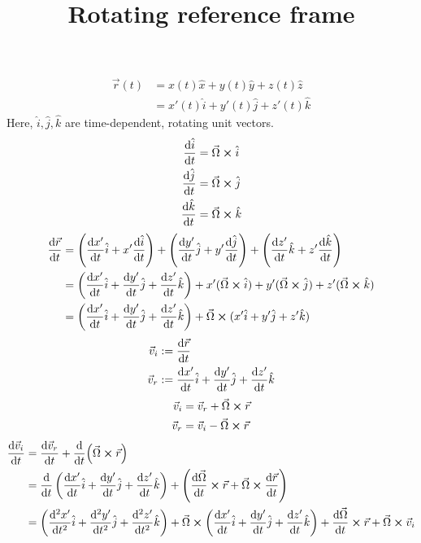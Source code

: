 \documentclass{article}
\title{Rotating reference frame}
\author{}
\date{}
\begin{document}
\maketitle

\begin{align*}
	\vec{r} (t) &= x (t) \hat{x} + y (t) \hat{y} + z (t) \hat{z} \\
	& = x' (t) \hat{i} + y' (t) \hat{j} + z' (t) \hat{k}
\end{align*}
Here, $\hat{i},\hat{j},\hat{k}$ are time-dependent, rotating unit vectors.
\begin{align*}
	\dv{\hat{i}}{t} &= \vec{\Omega} \cross \hat{i} \\
	\dv{\hat{j}}{t} &= \vec{\Omega} \cross \hat{j} \\
	\dv{\hat{k}}{t} &= \vec{\Omega} \cross \hat{k}
\end{align*}
\begin{align*}
	\dv{\vec{r}}{t} &= \left( \dv{x'}{t} \hat{i} + x'  \dv{\hat{i}}{t}  \right) + \left( \dv{y'}{t} \hat{j} + y' \dv{\hat{j}}{t} \right) + \left( \dv{z'}{t} \hat{k} + z' \dv{\hat{k}}{t} \right) \\
	&= \left( \dv{x'}{t} \hat{i} + \dv{y'}{t} \hat{j} + \dv{z'}{t} \hat{k} \right) + x' (\vec{\Omega} \cross \hat{i}) + y' (\vec{\Omega} \cross \hat{j}) + z' (\vec{\Omega} \cross \hat{k}) \\
	&= \left( \dv{x'}{t} \hat{i} + \dv{y'}{t} \hat{j} + \dv{z'}{t} \hat{k} \right) + \vec{\Omega} \cross (x' \hat{i} + y'\hat{j} + z' \hat{k})
\end{align*}
\begin{align*}
	\vec{v}_i &:= \dv{\vec{r}}{t} \\
	\vec{v}_r &:= \dv{x'}{t} \hat{i} + \dv{y'}{t} \hat{j} + \dv{z'}{t} \hat{k}
\end{align*}
\begin{align*}
	\vec{v}_i &= \vec{v}_r + \vec{\Omega} \cross \vec{r} \\
	\vec{v}_r &= \vec{v}_i - \vec{\Omega} \cross \vec{r}
\end{align*}
\begin{align*}
	\dv{\vec{v}_i}{t} &= \dv{\vec{v}_r}{t} + \dv{t} (\vec{\Omega} \cross \vec{r}) \\
	&= \dv{t} \left( \dv{x'}{t} \hat{i} + \dv{y'}{t} \hat{j} + \dv{z'}{t} \hat{k} \right) + \left( \dv{\vec{\Omega}}{t}  \cross \vec{r} + \vec{\Omega} \cross \dv{\vec{r}}{t} \right) \\
	&= \left( \dv[2]{x'}{t} \hat{i} + \dv[2]{y'}{t} \hat{j} + \dv[2]{z'}{t} \hat{k} \right) + \vec{\Omega} \cross \left( \dv{x'}{t} \hat{i} + \dv{y'}{t} \hat{j} + \dv{z'}{t} \hat{k} \right) + \dv{\vec{\Omega}}{t}  \cross \vec{r} + \vec{\Omega} \cross \vec{v}_i
\end{align*}
\end{document}
